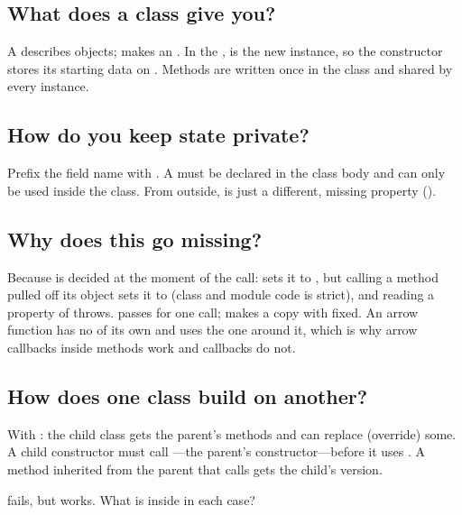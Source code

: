 \label{ch:c12}

\subsection{What does a class give you?}%
A  describes objects;  makes an . In the ,  is the new instance, so the constructor stores its starting data on . Methods are written once in the class and shared by every instance.

\subsection{How do you keep state private?}%
Prefix the field name with \code{\#}. A  must be declared in the class body and can only be used inside the class. From outside,  is just a different, missing property ().

\subsection{Why does this go missing?}%
Because  is decided at the moment of the call:  sets it to , but calling a method pulled off its object sets it to  (class and module code is strict), and reading a property of  throws.  passes  for one call;  makes a copy with  fixed. An arrow function has no  of its own and uses the one around it, which is why arrow callbacks inside methods work and  callbacks do not.

\subsection{How does one class build on another?}%
With : the child class gets the parent's methods and can replace (override) some. A child constructor must call ---the parent's constructor---before it uses . A method inherited from the parent that calls  gets the child's version.

\begin{ponder} fails, but  works. What is  inside  in each case?\end{ponder}
